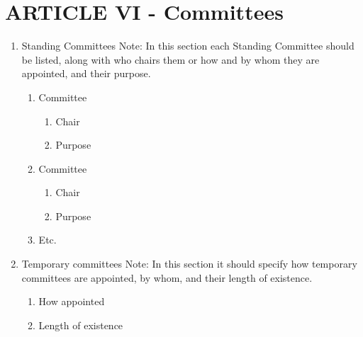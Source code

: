 
\section{ARTICLE VI - Committees}
\begin{enumerate}[label=\Alph*.]
  \item Standing Committees Note:  In this section each Standing Committee
  should be listed, along with who chairs them or how and by whom they are
  appointed, and their purpose.
    \begin{enumerate}
      \item Committee
        \begin{enumerate}
          \item Chair
          \item Purpose
        \end{enumerate}
      \item Committee 
        \begin{enumerate}
          \item Chair
          \item Purpose
        \end{enumerate}
      \item Etc.
    \end{enumerate}
  \item Temporary committees Note:  In this section it should specify how
  temporary committees are appointed, by whom, and their length of existence.
    \begin{enumerate}
      \item How appointed
      \item Length of existence
    \end{enumerate}
\end{enumerate}

